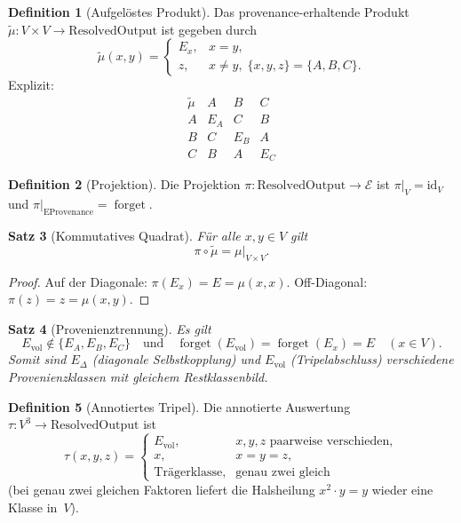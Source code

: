 \documentclass[11pt,a4paper]{article}
\newtheorem{theorem}{Satz}
\theoremstyle{definition}
\newtheorem{definition}[theorem]{Definition}
\theoremstyle{remark}
\newcommand{\E}{\mathcal{E}}
\newcommand{\Evol}{E_{\mathrm{vol}}}
\newcommand{\EDelta}{E_{\Delta}}
\newcommand{\forget}{\operatorname{forget}}
\begin{document}
	\begin{definition}[Aufgelöstes Produkt]
		\label{def:resolved-mul}
		Das provenance-erhaltende Produkt
		$\widetilde\mu:V\times V\to\mathrm{ResolvedOutput}$
		ist gegeben durch
		\[
		\widetilde\mu(x,y)
		=
		\begin{cases}
			E_x, & x=y,\\
			z, & x\neq y,\;\{x,y,z\}=\{A,B,C\}.
		\end{cases}
		\]
		Explizit:
		\[
		\begin{array}{c|ccc}
			\widetilde\mu & A & B & C \\ \hline
			A & E_A & C & B \\
			B & C & E_B & A \\
			C & B & A & E_C
		\end{array}
		\]
	\end{definition}
	
	\begin{definition}[Projektion]
		\label{def:project}
		Die Projektion $\pi:\mathrm{ResolvedOutput}\to\E$ ist
		$\pi|_V=\mathrm{id}_V$ und
		$\pi|_{\mathrm{EProvenance}}=\forget$.
	\end{definition}
	
	\begin{theorem}[Kommutatives Quadrat]
		\label{thm:commutes}
		Für alle $x,y\in V$ gilt
		\[
		\pi\circ\widetilde\mu=\mu\Big|_{V\times V}.
		\]
	\end{theorem}
	
	\begin{proof}
		Auf der Diagonale: $\pi(E_x)=E=\mu(x,x)$.
		Off-Diagonal: $\pi(z)=z=\mu(x,y)$.
	\end{proof}
	
	\begin{theorem}[Provenienztrennung]
		\label{thm:provenance}
		Es gilt
		\[
		\Evol\notin\{E_A,E_B,E_C\}
		\quad\text{und}\quad
		\forget(\Evol)=\forget(E_x)=E\quad(x\in V).
		\]
		Somit sind $\EDelta$ (diagonale Selbstkopplung) und $\Evol$ (Tripelabschluss)
		verschiedene Provenienzklassen mit gleichem Restklassenbild.
	\end{theorem}
	
	\begin{definition}[Annotiertes Tripel]
		\label{def:triple}
		Die annotierte Auswertung $\tau:V^3\to\mathrm{ResolvedOutput}$ ist
		\[
		\tau(x,y,z)
		=
		\begin{cases}
			\Evol, & x,y,z\text{ paarweise verschieden},\\
			x, & x=y=z,\\
			\text{Trägerklasse}, & \text{genau zwei gleich}
		\end{cases}
		\]
		(bei genau zwei gleichen Faktoren liefert die Halsheilung $x^2\cdot y=y$
		wieder eine Klasse in~$V$).
	\end{definition}
	
\end{document}
